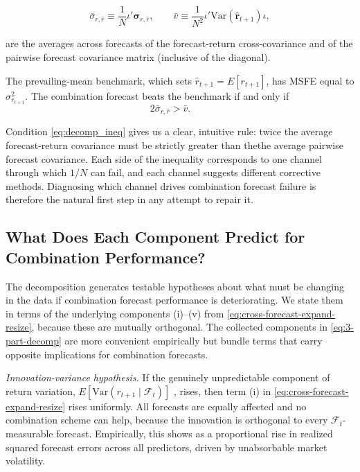 \documentclass[a4paper,11pt]{article}
\begin{document}
$$ \bar{\sigma}_{r,\hat{r}} \equiv \frac{1}{N} \iota' \boldsymbol{\sigma}_{r,\hat{r}}, \qquad \bar{v} \equiv \frac{1}{N^2} \iota' \mathrm{Var}(\hat{\mathbf{r}}_{t+1}) \iota, $$

\noindent are the averages across forecasts of the forecast-return cross-covariance and of the pairwise forecast covariance matrix (inclusive of the diagonal).

The prevailing-mean benchmark, which sets $\hat{r}_{t+1} = E[r_{t+1}]$,  has MSFE equal to $\sigma_{r_{t+1}}^2$. The combination forecast beats the benchmark if and only if
\begin{equation}
2\bar{\sigma}_{r,\hat{r}} > \bar{v}. \qquad     
\label{eq:decomp_ineq}
\end{equation}


Condition \eqref{eq:decomp_ineq} gives us a clear, intuitive rule: twice the average forecast-return covariance must be strictly greater than thethe average pairwise forecast covariance. Each side of the inequality corresponds to one channel through which $1/N$ can fail, and each channel suggests different corrective methods. Diagnosing which channel drives combination forecast failure is therefore the natural first step in any attempt to repair it.

\subsection{What Does Each Component Predict for Combination Performance?}
\label{subsec:component_meaning}
\noindent The decomposition generates testable hypotheses about what must be changing in the data if combination forecast performance is deteriorating. We state them in terms of the underlying components (i)--(v) from \ref{eq:cross-forecast-expand-resize}, because these are mutually orthogonal. The collected components in \ref{eq:3-part-decomp} are more convenient empirically but bundle terms that carry opposite implications for combination forecasts.

\textit{Innovation-variance hypothesis.} If the genuinely unpredictable component of return variation, $E[\mathrm{Var}(r_{t+1} \mid \mathcal{F}_t)]$ , rises, then term (i) in \ref{eq:cross-forecast-expand-resize} rises uniformly. All forecasts are equally affected and no combination scheme can help, because the innovation is orthogonal to every $\mathcal{F}_t$-measurable forecast. Empirically, this shows as a proportional rise in realized squared forecast errors across all predictors, driven by unabsorbable market volatility.
\end{document}
